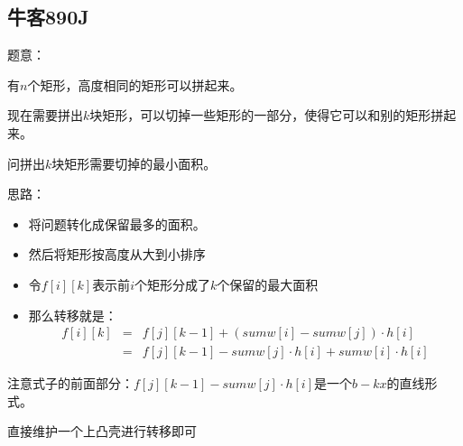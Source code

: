 \subsection{牛客890J}

题意：\par
有$n$个矩形，高度相同的矩形可以拼起来。\par
现在需要拼出$k$块矩形，可以切掉一些矩形的一部分，使得它可以和别的矩形拼起来。\par
问拼出$k$块矩形需要切掉的最小面积。\par

思路：\par
\begin{itemize}
\item 将问题转化成保留最多的面积。
\item 然后将矩形按高度从大到小排序
\item 令$f[i][k]$表示前$i$个矩形分成了$k$个保留的最大面积
\item 那么转移就是：
\begin{eqnarray*}
f[i][k] &=& f[j][k - 1] + (sumw[i] - sumw[j]) \cdot h[i] \\
&=& f[j][k - 1] - sumw[j] \cdot h[i] + sumw[i] \cdot h[i]
\end{eqnarray*} \par
\end{itemize} \par
注意式子的前面部分：$f[j][k - 1] - sumw[j] \cdot h[i]$是一个$b - kx$的直线形式。\par
直接维护一个上凸壳进行转移即可\par

